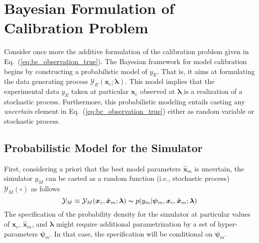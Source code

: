 \section{Bayesian Formulation of Calibration Problem}\label{sec:bc_modular}

Consider once more the additive formulation of the calibration problem given in Eq.~(\ref{eq:bc_observation_true}).
The Bayesian framework for model calibration begins by constructing a probabilistic model of $y_E$. 
That is, it aims at formulating the data generating process $\mathcal{Y}_E(\bm{x}_c; \bm{\lambda})$.
This model implies that the experimental data $y_E$ taken at particular $\bm{x}_c$ observed at $\bm{\lambda}$ is a realization of a stochastic process.
Furthermore, this probabilistic modeling entails casting any \emph{uncertain} element in Eq.~(\ref{eq:bc_observation_true}) either as random variable or stochastic process.

\subsection{Probabilistic Model for the Simulator}\label{sub:bc_modular_simulator}

First, considering a priori that the best model parameters $\hat{\bm{x}}_m$ is uncertain,
the simulator $y_M$ can be casted as a random function (i.e., stochastic process) $\mathcal{Y}_M (\circ)$ as follows
\begin{equation}
          \mathcal{Y}_M \equiv \mathcal{Y}_M (\bm{x}_c, \hat{\bm{x}}_m; \bm{\lambda}) \thicksim  p(y_m | \bm{\psi}_{m}, \bm{x}_c, \hat{\bm{x}}_m; \bm{\lambda})
\label{eq:bc_data_generating_simulator}
\end{equation}
The specification of the probability density for the simulator at particular values of $\bm{x}_c$, $\hat{\bm{x}}_m$, and $\bm{\lambda}$ might require additional parametrization by a set of hyper-parameters $\bm{\psi}_{m}$.
In that case, the specification will be conditional on $\bm{\psi}_{m}$.



